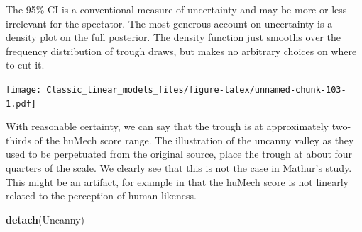\documentclass[]{svmono}
\newenvironment{Shaded}{\begin{snugshade}}{\end{snugshade}}
\newcommand{\KeywordTok}[1]{\textcolor[rgb]{0.13,0.29,0.53}{\textbf{#1}}}
\newcommand{\DataTypeTok}[1]{\textcolor[rgb]{0.13,0.29,0.53}{#1}}
\newcommand{\DecValTok}[1]{\textcolor[rgb]{0.00,0.00,0.81}{#1}}
\newcommand{\StringTok}[1]{\textcolor[rgb]{0.31,0.60,0.02}{#1}}
\newcommand{\OperatorTok}[1]{\textcolor[rgb]{0.81,0.36,0.00}{\textbf{#1}}}
\newcommand{\NormalTok}[1]{#1}
\theoremstyle{definition}
\theoremstyle{definition}
\theoremstyle{definition}
\theoremstyle{remark}
\begin{document}
The 95\% CI is a conventional measure of uncertainty and may be more or
less irrelevant for the spectator. The most generous account on
uncertainty is a density plot on the full posterior. The density
function just smooths over the frequency distribution of trough draws,
but makes no arbitrary choices on where to cut it.

\begin{Shaded}
\end{Shaded}

\texttt{[image: Classic\_linear\_models\_files/figure-latex/unnamed-chunk-103-1.pdf]}

With reasonable certainty, we can say that the trough is at
approximately two-thirds of the huMech score range. The illustration of
the uncanny valley as they used to be perpetuated from the original
source, place the trough at about four quarters of the scale. We clearly
see that this is not the case in Mathur's study. This might be an
artifact, for example in that the huMech score is not linearly related
to the perception of human-likeness.

\begin{Shaded}
\begin{Highlighting}[]
\KeywordTok{detach}\NormalTok{(Uncanny)}
\end{Highlighting}
\end{Shaded}
\end{document}

